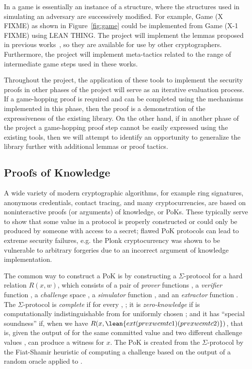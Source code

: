In \vcvio a game is essentially an instance of a  structure, where the  structures used in simulating an adversary are successively modified.  
For example, Game (X FIXME) as shown in Figure~\ref{fig:game} could be implemented from Game (X-1 FIXME) using LEAN THING. 
The project will implement the lemmas proposed in previous works~\cite{bellare2006security,shoup2004sequences,halevi2005plausible}, so they are available for use by other cryptographers.
Furthermore, the project will implement meta-tactics related to the range of intermediate game steps used in these works. 

Throughout the project, the application of these tools to implement the security proofs in other phases of the project will serve as an iterative evaluation process.
If a game-hopping proof is required and can be completed using the mechanisms implemented in this phase, then the proof is a demonstration of the expressiveness of the existing library.
On the other hand, if in another phase of the project a game-hopping proof step cannot be easily expressed using the existing tools, then we will attempt to identify an opportunity to generalize the library further with additional lemmas or proof tactics.

\subsection{Proofs of Knowledge} \label{sec:pok}

A wide variety of modern cryptographic algorithms, for example ring signatures, anonymous credentials, contact tracing, and many cryptocurrencies, are based on noninteractive proofs (or arguments) of knowledge, or PoKs.  These typically serve to show that some value in a protocol is properly constructed or could only be produced by someone with access to a secret; flawed PoK protocols can lead to extreme security failures, e.g. the Plonk cryptocurrency was shown to be vulnerable to arbitrary forgeries due to an incorrect argument of knowledge implementation.

The common way to construct a PoK is by constructing a $\Sigma$-protocol for a hard relation $R(x,w)$, which consists of a pair of {\em prover} functions , a {\em verifier} function , a {\em challenge} space , a {\em simulator} function , and an {\em extractor} function .  
The $\Sigma$-protocol is {\em complete} if for every , ; 
it is {\em zero-knowledge} if  is computationally indistinguishable from  for uniformly chosen ; 
and it has ``special soundness'' if, when  we have $R(x,\lean{ext (prv x w cmt c1) (prv x w cmt c2)})$, that is, given the output of  for the same committed value  and two different challenge values ,  can produce a witness for $x$.  
The PoK is created from the $\Sigma$-protocol by the Fiat-Shamir heuristic of computing a challenge based on the output of a random oracle applied to .  

